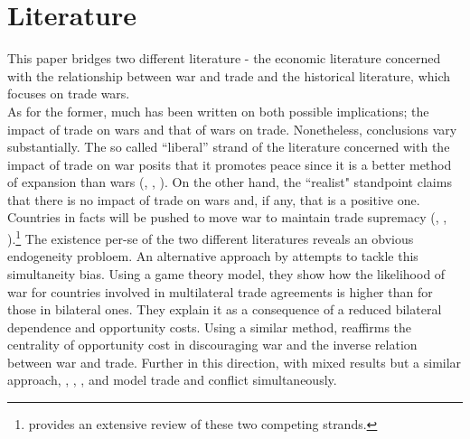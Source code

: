 \documentclass[12pt,a4paper,notitlepage,english]{article}
\begin{document}
\section{Literature} \label{literature}
This paper bridges two different literature - the economic literature concerned with the relationship between war and trade and the historical literature, which focuses on trade wars. \\
As for the former, much has been written on both possible implications; the impact of trade on wars and that of wars on trade. Nonetheless, conclusions vary substantially. The so called ``liberal'' strand of the literature concerned with the impact of trade on war posits that it promotes peace since it is a better method of expansion than wars (\cite{Doyle1997}, \cite{Oneal1997}, \cite{Polachek1980}). On the other hand, the ``realist" standpoint claims that there is no impact of trade on wars and, if any, that is a positive one. Countries in facts will be pushed to move war to maintain trade supremacy (\cite{Ripsman1996}, \cite{Levy1990}, \cite{Buzan1984}).\footnote{\cite{Mcmillan1997} provides an extensive review of these two competing strands.} 
The existence per-se of the two different literatures reveals an obvious endogeneity probloem. An alternative approach by \cite{Martin2008} attempts to tackle this simultaneity bias. Using a game theory model, they show how the likelihood of war for countries involved in multilateral trade agreements is higher than for those in bilateral ones. They explain it as a consequence of a reduced bilateral dependence and opportunity costs. Using a similar method, \cite{polachek2010opportunity} reaffirms the centrality of opportunity cost in discouraging war and the inverse relation between war and trade. Further in this direction, with mixed results but a similar approach, \cite{kim1998phd}, \cite{keshk2004trade}, \cite{hegre2010trade}, \cite{goenner2011simultaneity} and \cite{leonard2020containing} model trade and conflict simultaneously. 
\end{document}
